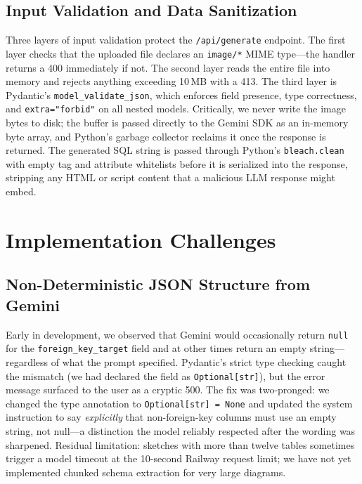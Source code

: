 \documentclass[conference]{IEEEtran}
\begin{document}
\subsection{Input Validation and Data Sanitization}

Three layers of input validation protect the \texttt{/api/generate}
endpoint. The first layer checks that the uploaded file declares an
\texttt{image/*} MIME type---the handler returns a 400 immediately
if not. The second layer reads the entire file into memory and
rejects anything exceeding 10\,MB with a 413. The third layer is
Pydantic's \texttt{model\_validate\_json}, which enforces field
presence, type correctness, and \texttt{extra="forbid"} on all
nested models. Critically, we never write the image bytes to disk;
the buffer is passed directly to the Gemini SDK as an in-memory
byte array, and Python's garbage collector reclaims it once the
response is returned. The generated SQL string is passed through
Python's \texttt{bleach.clean} with empty tag and attribute whitelists
before it is serialized into the response, stripping any HTML or
script content that a malicious LLM response might embed.

\section{Implementation Challenges}

\subsection{Non-Deterministic JSON Structure from Gemini}

Early in development, we observed that Gemini would occasionally
return \texttt{null} for the \texttt{foreign\_key\_target} field and
at other times return an empty string---regardless of what the
prompt specified. Pydantic's strict type checking caught the
mismatch (we had declared the field as \texttt{Optional[str]}),
but the error message surfaced to the user as a cryptic 500.
The fix was two-pronged: we changed the type annotation to
\texttt{Optional[str] = None} and updated the system instruction
to say \emph{explicitly} that non-foreign-key columns must use an
empty string, not null---a distinction the model reliably respected
after the wording was sharpened. Residual limitation: sketches with
more than twelve tables sometimes trigger a model timeout at the
10-second Railway request limit; we have not yet implemented
chunked schema extraction for very large diagrams.
\end{document}

